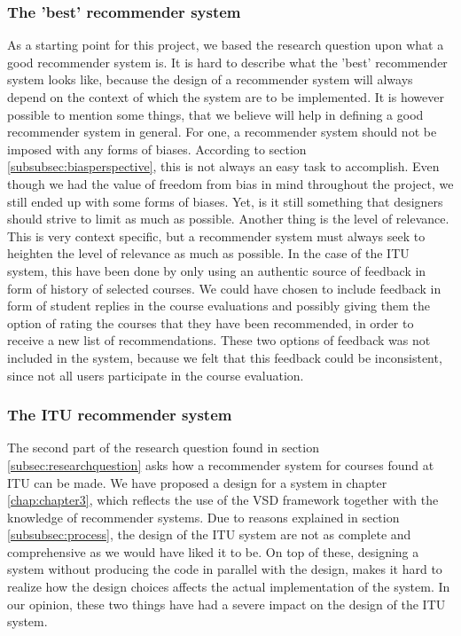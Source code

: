 \subsubsection*{The 'best' recommender system}
As a starting point for this project, we based the research question upon what a good recommender system is. It is hard to describe what the 'best' recommender system looks like, because the design of a recommender system will always depend on the context of which the system are to be implemented. It is however possible to mention some things, that we believe will help in defining a good recommender system in general. \newline 
For one, a recommender system should not be imposed with any forms of biases. According to section \ref{subsubsec:biasperspective}, this is not always an easy task to accomplish.\newline 
Even though we had the value of freedom from bias in mind throughout the project, we still ended up with some forms of biases. Yet, is it still something that designers should strive to limit as much as possible.\newline
Another thing is the level of relevance. This is very context specific, but a recommender system must always seek to heighten the level of relevance as much as possible. In the case of the ITU system, this have been done by only using an authentic source of feedback in form of history of selected courses.\newline
We could have chosen to include feedback in form of student replies in the course evaluations and possibly giving them the option of rating the courses that they have been recommended, in order to receive a new list of recommendations. These two options of feedback was not included in the system, because we felt that this feedback could be inconsistent, since not all users participate in the course evaluation.


\subsubsection{The ITU recommender system}
The second part of the research question found in section \ref{subsec:researchquestion} asks how a recommender system for courses found at ITU can be made. We have proposed a design for a system in chapter \ref{chap:chapter3}, which reflects the use of the VSD framework together with the knowledge of recommender systems. \newline
Due to reasons explained in section \ref{subsubsec:process}, the design of the ITU system are not as complete and comprehensive as we would have liked it to be.\newline 
On top of these, designing a system without producing the code in parallel with the design, makes it hard to realize how the design choices affects the actual implementation of the system. In our opinion, these two things have had a severe impact on the design of the ITU system. \newline 

